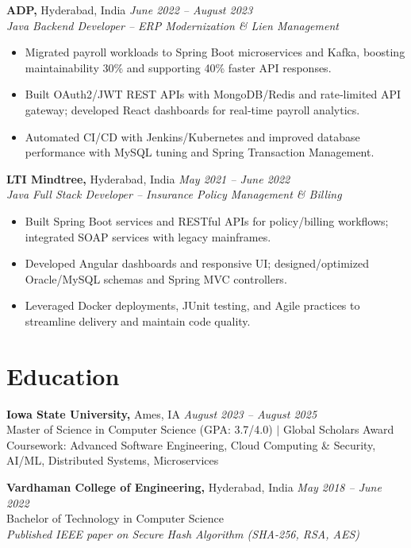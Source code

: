 \documentclass[10pt,a4paper]{article}
\begin{document}
\textbf{ADP,} Hyderabad, India \hfill \textit{June 2022 -- August 2023}\\
\textit{Java Backend Developer -- ERP Modernization \& Lien Management}

\begin{itemize}
  \item Migrated payroll workloads to Spring Boot microservices and Kafka, boosting maintainability 30\% and supporting 40\% faster API responses.
  \item Built OAuth2/JWT REST APIs with MongoDB/Redis and rate‑limited API gateway; developed React dashboards for real‑time payroll analytics.
  \item Automated CI/CD with Jenkins/Kubernetes and improved database performance with MySQL tuning and Spring Transaction Management.
\end{itemize}

\textbf{LTI Mindtree,} Hyderabad, India \hfill \textit{May 2021 -- June 2022}\\
\textit{Java Full Stack Developer -- Insurance Policy Management \& Billing}

\begin{itemize}
  \item Built Spring Boot services and RESTful APIs for policy/billing workflows; integrated SOAP services with legacy mainframes.
  \item Developed Angular dashboards and responsive UI; designed/optimized Oracle/MySQL schemas and Spring MVC controllers.
  \item Leveraged Docker deployments, JUnit testing, and Agile practices to streamline delivery and maintain code quality.
\end{itemize}

\section{Education}

\textbf{Iowa State University,} Ames, IA \hfill \textit{August 2023 -- August 2025}\\
Master of Science in Computer Science (GPA: 3.7/4.0) $|$ Global Scholars Award\\
Coursework: Advanced Software Engineering, Cloud Computing \& Security, AI/ML, Distributed Systems, Microservices

\textbf{Vardhaman College of Engineering,} Hyderabad, India \hfill \textit{May 2018 -- June 2022}\\
Bachelor of Technology in Computer Science\\
\textit{Published IEEE paper on Secure Hash Algorithm (SHA-256, RSA, AES)}
\end{document}
